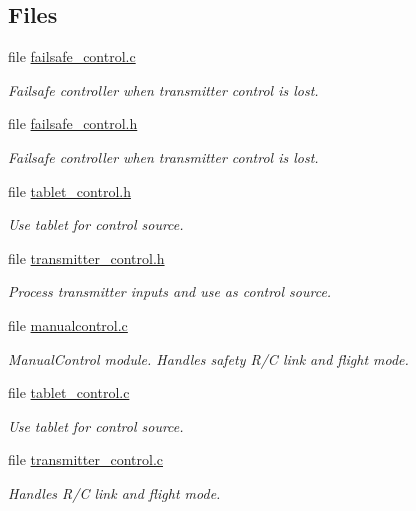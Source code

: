 \subsection*{\-Files}
\begin{DoxyCompactItemize}
\item 
file \hyperlink{failsafe__control_8c}{failsafe\-\_\-control.\-c}
\begin{DoxyCompactList}\small\item\em \-Failsafe controller when transmitter control is lost. \end{DoxyCompactList}\item 
file \hyperlink{failsafe__control_8h}{failsafe\-\_\-control.\-h}
\begin{DoxyCompactList}\small\item\em \-Failsafe controller when transmitter control is lost. \end{DoxyCompactList}\item 
file \hyperlink{tablet__control_8h}{tablet\-\_\-control.\-h}
\begin{DoxyCompactList}\small\item\em \-Use tablet for control source. \end{DoxyCompactList}\item 
file \hyperlink{transmitter__control_8h}{transmitter\-\_\-control.\-h}
\begin{DoxyCompactList}\small\item\em \-Process transmitter inputs and use as control source. \end{DoxyCompactList}\item 
file \hyperlink{manualcontrol_8c}{manualcontrol.\-c}
\begin{DoxyCompactList}\small\item\em \-Manual\-Control module. \-Handles safety \-R/\-C link and flight mode. \end{DoxyCompactList}\item 
file \hyperlink{tablet__control_8c}{tablet\-\_\-control.\-c}
\begin{DoxyCompactList}\small\item\em \-Use tablet for control source. \end{DoxyCompactList}\item 
file \hyperlink{transmitter__control_8c}{transmitter\-\_\-control.\-c}
\begin{DoxyCompactList}\small\item\em \-Handles \-R/\-C link and flight mode. \end{DoxyCompactList}\end{DoxyCompactItemize}
